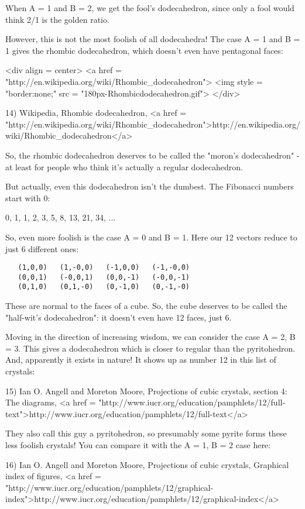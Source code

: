 When A = 1 and B = 2, we get the fool's dodecahedron, since only a 
fool would think 2/1 is the golden ratio.  

However, this is not the most foolish of all dodecahedra!   The 
case A = 1 and B = 1 gives the rhombic dodecahedron, which doesn't
even have pentagonal faces:

<div align = center>
<a href = "http://en.wikipedia.org/wiki/Rhombic_dodecahedron">
<img style = "border:none;" src = "180px-Rhombicdodecahedron.gif">
</div>  


14) Wikipedia, Rhombic dodecahedron, 
<a href = "http://en.wikipedia.org/wiki/Rhombic_dodecahedron">http://en.wikipedia.org/wiki/Rhombic_dodecahedron</a>

So, the rhombic dodecahedron deserves to be called the "moron's 
dodecahedron" - at least for people who think it's actually a 
regular dodecahedron.

But actually, even this dodecahedron isn't the dumbest.  The 
Fibonacci numbers start with 0:

0, 1, 1, 2, 3, 5, 8, 13, 21, 34, ...

So, even more foolish is the case A = 0 and B = 1.  Here our
12 vectors reduce to just 6 different ones:

\begin{verbatim}
   (1,0,0)   (1,-0,0)   (-1,0,0)   (-1,-0,0)
   (0,0,1)   (-0,0,1)   (0,0,-1)   (-0,0,-1)
   (0,1,0)   (0,1,-0)   (0,-1,0)   (0,-1,-0)
\end{verbatim}
    

These are normal to the faces of a cube.  So, the cube 
deserves to be called the "half-wit's dodecahedron": it 
doesn't even have 12 faces, just 6.

Moving in the direction of increasing wisdom, we can consider 
the case A = 2, B = 3.  This gives a dodecahedron which is
closer to regular than the pyritohedron.  And, apparently it
exists in nature!  It shows up as number 12 in this list of crystals:

15) Ian O. Angell and Moreton Moore, Projections of cubic crystals,
section 4: The diagrams, 
<a href = "http://www.iucr.org/education/pamphlets/12/full-text">http://www.iucr.org/education/pamphlets/12/full-text</a>

They also call this guy a pyritohedron, so presumably some 
pyrite forms these less foolish crystals!  You can compare it
with the A = 1, B = 2 case here:

16) Ian O. Angell and Moreton Moore, Projections of cubic crystals,
Graphical index of figures, 
<a href = "http://www.iucr.org/education/pamphlets/12/graphical-index">http://www.iucr.org/education/pamphlets/12/graphical-index</a>


